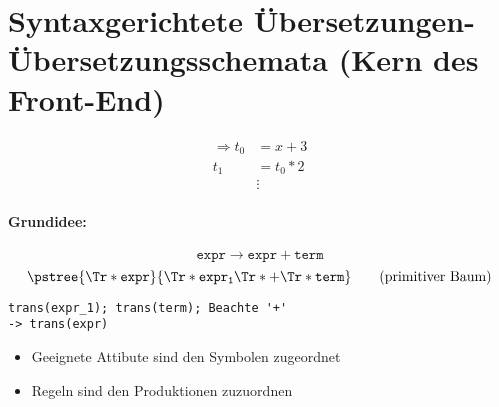 \section{Syntaxgerichtete Übersetzungen-Übersetzungsschemata (Kern des Front-End)}
\begin{minipage}{0.5\textwidth}
 \centering
\end{minipage}
\begin{minipage}{0.5\textwidth}
\begin{align*}
 \Rightarrow t_0 &= x + 3 \\
 t_1 &= t_0 * 2\\
 &\vdots
\end{align*}
\end{minipage}

\paragraph{Grundidee:}
\[\mathtt{expr} \to \mathtt{expr} + \mathtt{term} \tag{Produktion}\]
\[
	\pstree{\Tr*{\mathtt{expr}}}{
	 \Tr*{\mathtt{expr_1}} \Tr*{+} \Tr*{\mathtt{term}}
	} \tag{primitiver Baum}
\]
\begin{verbatim}
trans(expr_1); trans(term); Beachte '+'
-> trans(expr)
\end{verbatim}
\begin{itemize}
 \item Geeignete Attibute sind den Symbolen zugeordnet
 \item Regeln sind den Produktionen zuzuordnen
\end{itemize}
